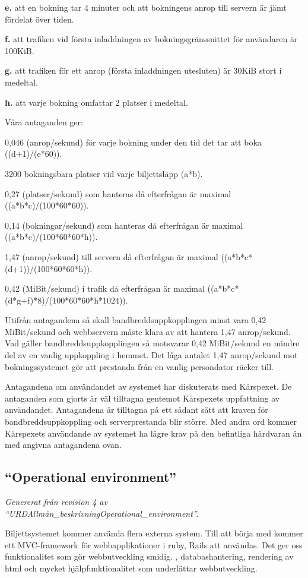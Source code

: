 \documentclass[a4paper, twoside, 11pt, titlepage]{article}
\begin{document}
	\textbf{e.} att en bokning tar 4 minuter och att bokningens anrop till servern är jämt fördelat över tiden. 

	\textbf{f.} att trafiken vid första inladdningen av bokningsgränssnittet för användaren är 100KiB.

	\textbf{g.} att trafiken för ett anrop (första inladdningen utesluten) är 30KiB stort i medeltal. 

	\textbf{h.} att varje bokning omfattar 2 platser i medeltal.

	Våra antaganden ger:

	0,046 (anrop/sekund) för varje bokning under den tid det tar att boka ((d+1)/(e*60)).

	3200 bokningsbara platser vid varje biljettsläpp (a*b).

	0,27 (platser/sekund) som hanteras då efterfrågan är maximal ((a*b*c)/(100*60*60)).

	0,14 (bokningar/sekund) som hanteras då efterfrågan är maximal ((a*b*c)/(100*60*60*h)).

	1,47 (anrop/sekund) till servern då efterfrågan är maximal ((a*b*c*(d+1))/(100*60*60*h)).

	0,42 (MiBit/sekund) i trafik då efterfrågan är maximal ((a*b*c*(d*g+f)*8)/(100*60*60*h*1024)).

	Utifrån antagandena så skall bandbreddsuppkopplingen minst vara 0,42 MiBit/sekund och webbservern måste klara av att hantera 1,47 anrop/sekund. Vad gäller bandbreddsuppkopplingen så motsvarar 0,42 MiBit/sekund en mindre del av en vanlig uppkoppling i hemmet. Det låga antalet 1,47 anrop/sekund mot bokningssystemet gör att prestanda från en vanlig persondator räcker till.

	Antagandena om användandet av systemet har diskuterats med Kårspexet. De antaganden som gjorts är väl tilltagna gentemot Kårspexets uppfattning av användandet. Antagandena är tilltagna på ett sådant sätt att kraven för bandbreddsuppkoppling och serverprestanda blir större. Med andra ord kommer Kårspexets användande av systemet ha lägre krav på den befintliga hårdvaran än med angivna antagandena ovan.

	\subsection{``Operational environment''}


	\emph{Genererat från revision 4 av ``URDAllmän\_beskrivningOperational\_environment''.}

	Biljettsystemet kommer använda flera externa system. Till att börja med kommer ett MVC-framework för webbapplikationer i ruby, Rails att användas. Det ger oss funktionalitet som gör webbutveckling smidig.  , databashantering, rendering av html och mycket hjälpfunktionalitet som underlättar webbutveckling.
\end{document}
